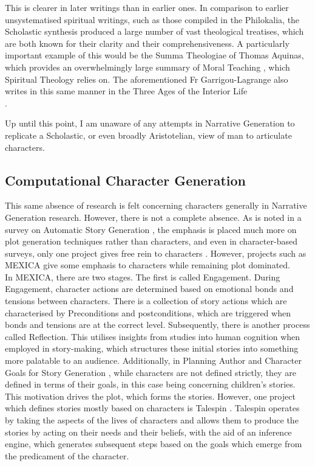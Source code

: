 \documentclass[11pt]{article}
\begin{document}
This is clearer in later writings than in earlier ones. In comparison to earlier unsystematised spiritual writings, such as those compiled in the Philokalia\cite{1983philokalia}, the Scholastic synthesis produced a large number of vast theological treatises, which are both known for their clarity and their comprehensiveness. A particularly important example of this would be the Summa Theologiae of Thomas Aquinas, which provides an overwhelmingly large summary of Moral Teaching \cite{aquinas2014summa}, which Spiritual Theology relies on. The aforementioned Fr Garrigou-Lagrange also writes in this same manner in the Three Ages of the Interior Life\\.

Up until this point, I am unaware of any attempts in Narrative Generation to replicate a Scholastic, or even broadly Aristotelian, view of man to articulate characters.\\
\subsection{Computational Character Generation}
This same absence of research is felt concerning characters generally in Narrative Generation research. However, there is not a complete absence. As is noted in a survey on Automatic Story Generation \cite{AutomaticStoryGeneration2021}, the emphasis is placed much more on plot generation techniques rather than characters, and even in character-based surveys, only one project gives free rein to characters \cite{Riedl2003CharacterfocusedNP}. However, projects such as MEXICA\cite{MEXICA} give some emphasis to characters while remaining plot dominated.\\

In MEXICA, there are two stages. The first is called Engagement. During Engagement, character actions are determined based on emotional bonds and tensions between characters. There is a collection of story actions which are characterised by Preconditions and postconditions, which are triggered when bonds and tensions are at the correct level. Subsequently, there is another process called Reflection. This utilises insights from studies into human cognition when employed in story-making, which structures these initial stories into something more palatable to an audience. Additionally, in Planning Author and Character Goals for Story Generation \cite{authorandcharactergoals}, while characters are not defined strictly, they are defined in terms of their goals, in this case being concerning children's stories. This motivation drives the plot, which forms the stories. However, one project which defines stories mostly based on characters is Talespin \cite{Meehan1977TALESPINAI}. Talespin operates by taking the aspects of the lives of characters and allows them to produce the stories by acting on their needs and their beliefs, with the aid of an inference engine, which generates subsequent steps based on the goals which emerge from the predicament of the character.  \\  
\end{document}
